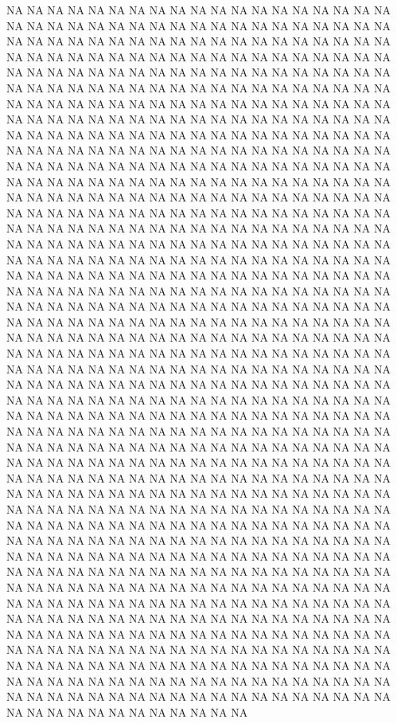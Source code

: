 {NA
NA
NA
NA
NA
NA
NA
NA
NA
NA
NA
NA
NA
NA
NA
NA
NA
NA
NA
NA
NA
NA
NA
NA
NA
NA
NA
NA
NA
NA
NA
NA
NA
NA
NA
NA
NA
NA
NA
NA
NA
NA
NA
NA
NA
NA
NA
NA
NA
NA
NA
NA
NA
NA
NA
NA
NA
NA
NA
NA
NA
NA
NA
NA
NA
NA
NA
NA
NA
NA
NA
NA
NA
NA
NA
NA
NA
NA
NA
NA
NA
NA
NA
NA
NA
NA
NA
NA
NA
NA
NA
NA
NA
NA
NA
NA
NA
NA
NA
NA
NA
NA
NA
NA
NA
NA
NA
NA
NA
NA
NA
NA
NA
NA
NA
NA
NA
NA
NA
NA
NA
NA
NA
NA
NA
NA
NA
NA
NA
NA
NA
NA
NA
NA
NA
NA
NA
NA
NA
NA
NA
NA
NA
NA
NA
NA
NA
NA
NA
NA
NA
NA
NA
NA
NA
NA
NA
NA
NA
NA
NA
NA
NA
NA
NA
NA
NA
NA
NA
NA
NA
NA
NA
NA
NA
NA
NA
NA
NA
NA
NA
NA
NA
NA
NA
NA
NA
NA
NA
NA
NA
NA
NA
NA
NA
NA
NA
NA
NA
NA
NA
NA
NA
NA
NA
NA
NA
NA
NA
NA
NA
NA
NA
NA
NA
NA
NA
NA
NA
NA
NA
NA
NA
NA
NA
NA
NA
NA
NA
NA
NA
NA
NA
NA
NA
NA
NA
NA
NA
NA
NA
NA
NA
NA
NA
NA
NA
NA
NA
NA
NA
NA
NA
NA
NA
NA
NA
NA
NA
NA
NA
NA
NA
NA
NA
NA
NA
NA
NA
NA
NA
NA
NA
NA
NA
NA
NA
NA
NA
NA
NA
NA
NA
NA
NA
NA
NA
NA
NA
NA
NA
NA
NA
NA
NA
NA
NA
NA
NA
NA
NA
NA
NA
NA
NA
NA
NA
NA
NA
NA
NA
NA
NA
NA
NA
NA
NA
NA
NA
NA
NA
NA
NA
NA
NA
NA
NA
NA
NA
NA
NA
NA
NA
NA
NA
NA
NA
NA
NA
NA
NA
NA
NA
NA
NA
NA
NA
NA
NA
NA
NA
NA
NA
NA
NA
NA
NA
NA
NA
NA
NA
NA
NA
NA
NA
NA
NA
NA
NA
NA
NA
NA
NA
NA
NA
NA
NA
NA
NA
NA
NA
NA
NA
NA
NA
NA
NA
NA
NA
NA
NA
NA
NA
NA
NA
NA
NA
NA
NA
NA
NA
NA
NA
NA
NA
NA
NA
NA
NA
NA
NA
NA
NA
NA
NA
NA
NA
NA
NA
NA
NA
NA
NA
NA
NA
NA
NA
NA
NA
NA
NA
NA
NA
NA
NA
NA
NA
NA
NA
NA
NA
NA
NA
NA
NA
NA
NA
NA
NA
NA
NA
NA
NA
NA
NA
NA
NA
NA
NA
NA
NA
NA
NA
NA
NA
NA
NA
NA
NA
NA
NA
NA
NA
NA
NA
NA
NA
NA
NA
NA
NA
NA
NA
NA
NA
NA
NA
NA
NA
NA
NA
NA
NA
NA
NA
NA
NA
NA
NA
NA
NA
NA
NA
NA
NA
NA
NA
NA
NA
NA
NA
NA
NA
NA
NA
NA
NA
NA
NA
NA
NA
NA
NA
NA
NA
NA
NA
NA
NA
NA
NA
NA
NA
NA
NA
NA
NA
NA
NA
NA
NA
NA
NA
NA
NA
NA
NA
NA
NA
NA
NA
NA
NA
NA
NA
NA
NA
NA
NA
NA
NA
NA
NA
NA
NA
NA
NA
NA
NA
NA
NA
NA
NA
NA
NA
NA
NA
NA
NA
NA
NA
NA
NA
NA
NA
NA
NA
NA
NA
NA
NA
NA
NA
NA
NA
NA
NA
NA
NA
NA
NA
NA
NA
NA
NA
NA
NA
NA
NA
NA
NA
NA
NA
NA
NA
NA
NA
NA
NA
NA
NA
NA
NA
NA
NA
NA
NA
NA
NA
NA
NA
NA
NA
NA
NA
NA
NA
NA
NA
NA
NA
NA
NA
NA
NA
NA
NA
NA
NA
NA
NA
NA
NA
NA
NA
NA
NA
NA
NA
NA
NA
NA
NA
NA
NA
NA
NA
NA
NA
NA
NA
NA
NA
NA
NA
NA
NA
NA
NA
NA
NA
NA
NA
NA
NA
NA
NA
NA
NA
NA
NA
NA
NA
NA
NA
NA
NA
NA
NA
NA
NA
NA
NA
NA
NA
NA
NA
NA
NA
NA
NA
NA
NA
NA
NA
NA
NA
NA
NA
NA
NA
NA
NA
NA
NA
NA
NA
NA
NA
NA
NA
NA
NA
NA
NA
NA
NA
NA
NA
NA
NA
NA
NA
NA
NA
NA
NA
NA
NA
NA
NA
NA
NA
NA
NA
NA
NA
NA
NA
NA
NA
NA
NA
NA
NA
NA
NA
NA
NA
NA
NA
NA
NA
NA
NA
NA
NA
NA
NA
NA
NA
NA
NA
NA
NA
NA
NA
NA
NA
NA
NA
NA
NA
NA
NA
NA
NA
NA
NA
NA
NA
NA
NA
NA
NA
NA
NA
NA
NA
NA
NA
NA
NA
NA
NA
NA
NA
NA
NA
NA
NA
NA
NA
NA
NA
NA
NA
NA
NA
NA
NA
NA
NA
NA
NA
NA
NA
NA
NA
NA
NA
NA
NA
NA
NA
NA
NA
NA
NA
NA
NA
NA
NA
NA
NA
NA
NA
NA
NA
NA
NA
NA
NA
NA
NA
NA
NA
}
